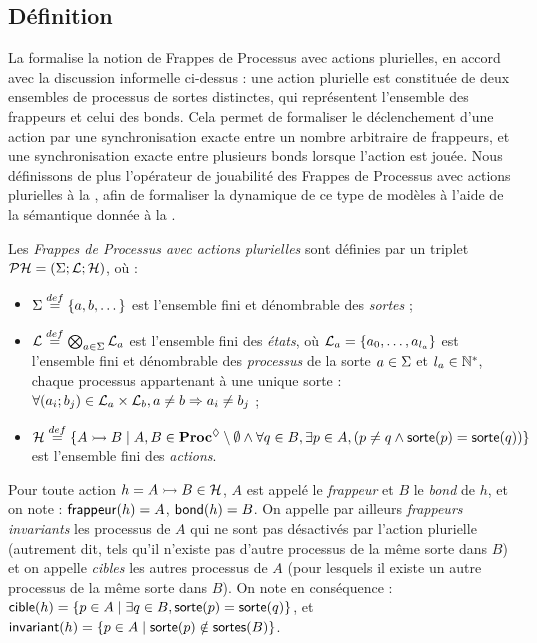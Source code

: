 \subsection{Définition}

La  formalise la notion de Frappes de Processus avec actions plurielles,
en accord avec la discussion informelle ci-dessus :
une action plurielle est constituée de deux ensembles de processus de sortes distinctes,
qui représentent l'ensemble des frappeurs et celui des bonds.
Cela permet de formaliser le déclenchement d'une action par une synchronisation exacte
entre un nombre arbitraire de frappeurs,
et une synchronisation exacte entre plusieurs bonds lorsque l'action est jouée.
Nous définissons de plus l'opérateur de jouabilité
des Frappes de Processus avec actions plurielles
à la ,
afin de formaliser la dynamique de ce type de modèles
à l'aide de la sémantique donnée à la .

\begin{definition}
  Les \emph{Frappes de Processus avec actions plurielles} sont définies
  par un triplet $\mathcal{PH} = (\Sigma; \mathcal{L}; \mathcal{H})$, où :
  \begin{itemize}
    \item $\Sigma \stackrel{def}= \{a, b, \dots\}$ est l'ensemble fini et dénombrable des \emph{sortes} ;
    \item $\mathcal{L} \stackrel{def}= \bigotimes_{a \in \Sigma} \mathcal{L}_a$ est l'ensemble fini des \emph{états},
      où $\mathcal{L}_a = \{a_0, \ldots, a_{l_a}\}$ est l'ensemble fini et dénombrable
      des \emph{processus} de la sorte $a \in \Sigma$ et $l_a \in \mathbb{N}^*$,
      chaque processus appartenant à une unique sorte :
      $\forall (a_i; b_j) \in \mathcal{L}_a \times \mathcal{L}_b, a \neq b \Rightarrow a_i \neq b_j$ ;
    \item $\mathcal{H} \stackrel{def}= \{\mbox{$A \rightarrowtail B$} \mid A, B \in \mathbf{Proc}^{\lozenge} \setminus \emptyset \wedge
      \forall q \in B, \exists p \in A, (p \neq q \wedge \mathsf{sorte}(p) = \mathsf{sorte}(q)) \}$
      est l'ensemble fini des \emph{actions}.
  \end{itemize}
\end{definition}

\noindent
Pour toute action $h = \mbox{$A \rightarrowtail B$} \in \mathcal{H}$,
$A$ est appelé le \emph{frappeur} et $B$ le \emph{bond} de $h$,
et on note : $\mathsf{frappeur}(h) = A$, $\mathsf{bond}(h) = B$.
On appelle par ailleurs \emph{frappeurs invariants} les processus de $A$
qui ne sont pas désactivés par l'action plurielle
(autrement dit, tels qu'il n'existe pas d'autre processus de la même sorte dans $B$)
et on appelle \emph{cibles} les autres processus de $A$
(pour lesquels il existe un autre processus de la même sorte dans $B$).
On note en conséquence :
$\mathsf{cible}(h) = \{ p \in A \mid \exists q \in B, \mathsf{sorte}(p) = \mathsf{sorte}(q) \}$,
et $\mathsf{invariant}(h) = \{ p \in A \mid \mathsf{sorte}(p) \notin \mathsf{sortes}(B) \}$.

